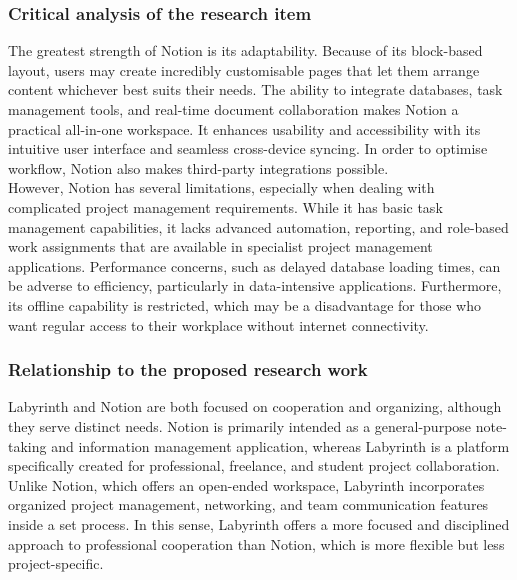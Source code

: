 \documentclass{FastFyp}
\begin{document}
\subsubsection{Critical analysis of the research item}
The greatest strength of Notion is its adaptability.   Because of its block-based layout, users may create incredibly customisable pages that let them arrange content whichever best suits their needs.   The ability to integrate databases, task management tools, and real-time document collaboration makes Notion a practical all-in-one workspace.   It enhances usability and accessibility with its intuitive user interface and seamless cross-device syncing.   In order to optimise workflow, Notion also makes third-party integrations possible. \\
However, Notion has several limitations, especially when dealing with complicated project management requirements.  While it has basic task management capabilities, it lacks advanced automation, reporting, and role-based work assignments that are available in specialist project management applications.  Performance concerns, such as delayed database loading times, can be adverse to efficiency, particularly in data-intensive applications.  Furthermore, its offline capability is restricted, which may be a disadvantage for those who want regular access to their workplace without internet connectivity.

\subsubsection{Relationship to the proposed research work}
Labyrinth and Notion are both focused on cooperation and organizing, although they serve distinct needs.  Notion is primarily intended as a general-purpose note-taking and information management application, whereas Labyrinth is a platform specifically created for professional, freelance, and student project collaboration.  Unlike Notion, which offers an open-ended workspace, Labyrinth incorporates organized project management, networking, and team communication features inside a set process.
In this sense, Labyrinth offers a more focused and disciplined approach to professional cooperation than Notion, which is more flexible but less project-specific.
\end{document}
